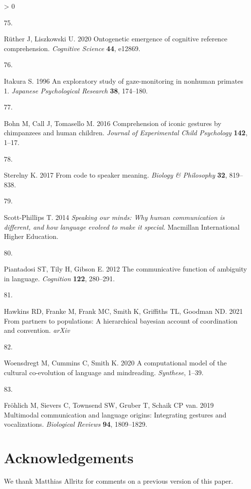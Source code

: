 \documentclass[
  english,
  man,floatsintext]{apa6}
\newlength{\cslhangindent}
\newlength{\csllabelwidth}
\newenvironment{CSLReferences}[2] %
 {%
  \setlength{\parindent}{0pt}
  \ifodd #1 \everypar{\setlength{\hangindent}{\cslhangindent}}\ignorespaces\fi
  \ifnum #2 > 0
  \setlength{\parskip}{#2\baselineskip}
  \fi
 }%
 {}
\newcommand{\CSLLeftMargin}[1]{\parbox[t]{\csllabelwidth}{#1}}
\newcommand{\CSLRightInline}[1]{\parbox[t]{\linewidth - \csllabelwidth}{#1}\break}
\begin{document}
\begin{CSLReferences}{0}{0}
\leavevmode\hypertarget{ref-ruther2020ontogenetic}{}%
\CSLLeftMargin{75. }
\CSLRightInline{Rüther J, Liszkowski U. 2020 Ontogenetic emergence of cognitive reference comprehension. \emph{Cognitive Science} \textbf{44}, e12869.}

\leavevmode\hypertarget{ref-itakura1996exploratory}{}%
\CSLLeftMargin{76. }
\CSLRightInline{Itakura S. 1996 An exploratory study of gaze-monitoring in nonhuman primates 1. \emph{Japanese Psychological Research} \textbf{38}, 174--180.}

\leavevmode\hypertarget{ref-bohn2016comprehension}{}%
\CSLLeftMargin{77. }
\CSLRightInline{Bohn M, Call J, Tomasello M. 2016 Comprehension of iconic gestures by chimpanzees and human children. \emph{Journal of Experimental Child Psychology} \textbf{142}, 1--17.}

\leavevmode\hypertarget{ref-sterelny2017code}{}%
\CSLLeftMargin{78. }
\CSLRightInline{Sterelny K. 2017 From code to speaker meaning. \emph{Biology \& Philosophy} \textbf{32}, 819--838.}

\leavevmode\hypertarget{ref-scott2014speaking}{}%
\CSLLeftMargin{79. }
\CSLRightInline{Scott-Phillips T. 2014 \emph{Speaking our minds: Why human communication is different, and how language evolved to make it special}. Macmillan International Higher Education. }

\leavevmode\hypertarget{ref-piantadosi2012communicative}{}%
\CSLLeftMargin{80. }
\CSLRightInline{Piantadosi ST, Tily H, Gibson E. 2012 The communicative function of ambiguity in language. \emph{Cognition} \textbf{122}, 280--291.}

\leavevmode\hypertarget{ref-hawkins2021partners}{}%
\CSLLeftMargin{81. }
\CSLRightInline{Hawkins RD, Franke M, Frank MC, Smith K, Griffiths TL, Goodman ND. 2021 From partners to populations: A hierarchical bayesian account of coordination and convention. \emph{arXiv} }

\leavevmode\hypertarget{ref-woensdregt2020computational}{}%
\CSLLeftMargin{82. }
\CSLRightInline{Woensdregt M, Cummins C, Smith K. 2020 A computational model of the cultural co-evolution of language and mindreading. \emph{Synthese}, 1--39.}

\leavevmode\hypertarget{ref-frohlich2019multimodal}{}%
\CSLLeftMargin{83. }
\CSLRightInline{Fröhlich M, Sievers C, Townsend SW, Gruber T, Schaik CP van. 2019 Multimodal communication and language origins: Integrating gestures and vocalizations. \emph{Biological Reviews} \textbf{94}, 1809--1829.}

\end{CSLReferences}

\endgroup

\hypertarget{acknowledgements}{%
\section{Acknowledgements}\label{acknowledgements}}

We thank Matthias Allritz for comments on a previous version of this paper.
\end{document}
